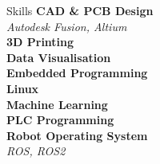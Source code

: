 \documentclass{minimal-resume}
\begin{document}
\begin{minipage}[t]{0.25\textwidth}
\begin{section}{Skills}
    \textbf{CAD \& PCB Design} \\[2pt]
    \textit{Autodesk Fusion, Altium} \\[8pt]

    \textbf{3D Printing} \\[8pt]

    \textbf{Data Visualisation} \\[8pt]

    \textbf{Embedded Programming} \\[8pt]

    \textbf{Linux} \\[8pt]

    \textbf{Machine Learning} \\[8pt]

    \textbf{PLC Programming} \\[8pt]

    \textbf{Robot Operating System} \\[2pt]
    \textit{ROS, ROS2}
  \end{section}

\end{minipage}%
\hspace{0.06\textwidth}
\end{document}
